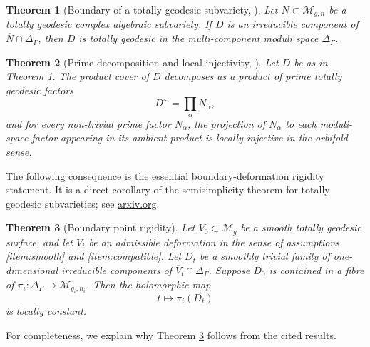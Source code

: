 \documentclass[11pt]{article}
\newtheorem{theorem}{Theorem}
\theoremstyle{definition}
\newcommand{\M}{\mathcal M}
\newcommand{\ov}{\overline}
\begin{document}
\begin{theorem}[Boundary of a totally geodesic subvariety, {\cite[Theorem 1.4]{boundary}}]\label{thm:boundaryTG}
Let $N\subset \M_{g,n}$ be a totally geodesic complex algebraic subvariety.  If $D$ is an irreducible component of $\ov N\cap\Delta_\Gamma$, then $D$ is totally geodesic in the multi-component moduli space $\Delta_\Gamma$.
\end{theorem}

\begin{theorem}[Prime decomposition and local injectivity, {\cite[Theorem 1.5]{boundary}}]\label{thm:prime}
Let $D$ be as in Theorem \ref{thm:boundaryTG}.  The product cover of $D$ decomposes as a product of prime totally geodesic factors
\[
D^\sim = \prod_\alpha N_\alpha,
\]
and for every non-trivial prime factor $N_\alpha$, the projection of $N_\alpha$ to each moduli-space factor appearing in its ambient product is locally injective in the orbifold sense.
\end{theorem}

The following consequence is the essential boundary-deformation rigidity statement.  It is a direct corollary of the semisimplicity theorem for totally geodesic subvarieties; see
\href{https://arxiv.org/html/2412.16330v2}{arxiv.org}.

\begin{theorem}[Boundary point rigidity]\label{thm:point-rigidity}
Let $V_0\subset\M_g$ be a smooth totally geodesic surface, and let $V_t$ be an admissible deformation in the sense of assumptions \eqref{item:smooth} and \eqref{item:compatible}.  Let $D_t$ be a smoothly trivial family of one-dimensional irreducible components of $\ov V_t\cap\Delta_\Gamma$.  Suppose $D_0$ is contained in a fibre of $\pi_i:\Delta_\Gamma\to\M_{g_i,n_i}$.  Then the holomorphic map
\[
t\longmapsto \pi_i(D_t)
\]
is locally constant.
\end{theorem}

For completeness, we explain why Theorem \ref{thm:point-rigidity} follows from the cited results.
\end{document}
